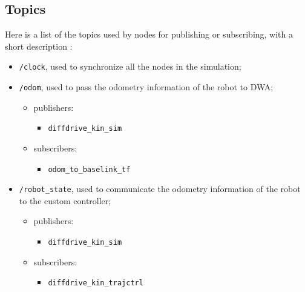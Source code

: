 \documentclass[11pt,a4paper]{article}
\begin{document}

\subsection{Topics}

Here is a list of the topics used by nodes for publishing or subscribing, with a short description :\\

\begin{itemize}

    \item \texttt{/clock}, used to synchronize all the nodes in the simulation;

    \item \texttt{/odom}, used to pass the odometry information of the robot to DWA;
        \begin{itemize}
            \item publishers:
                \begin{itemize}
                    \item \texttt{diffdrive\_kin\_sim}
                \end{itemize}
            \item subscribers:
                \begin{itemize}
                    \item \texttt{odom\_to\_baselink\_tf}
                \end{itemize}
        \end{itemize}

    \item \texttt{/robot\_state}, used to communicate the odometry information of the robot to the custom controller;
        \begin{itemize}
            \item publishers:
                \begin{itemize}
                    \item \texttt{diffdrive\_kin\_sim}
                \end{itemize}
            \item subscribers:
                \begin{itemize}
                    \item \texttt{diffdrive\_kin\_trajctrl}
                \end{itemize}
        \end{itemize}


\end{itemize}
\end{document}
